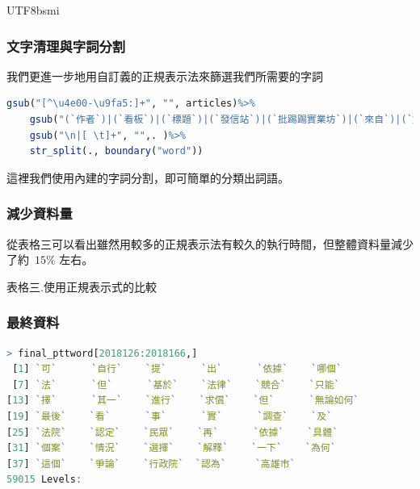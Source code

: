 \documentclass[utf8]{beamer}
\begin{document}
\begin{CJK}{UTF8}{bsmi}
\begin{frame}[fragile]
\frametitle{文字清理與字詞分割}
我們更進一步地用自訂義的正規表示法來篩選我們所需要的字詞
\begin{lstlisting}[language=R,backgroundcolor=\color{lightgray!0!white},identifierstyle=\color{blue},stringstyle=\color{orange},keywordstyle=\color{green!60!black}\bfseries]
gsub("[^\u4e00-\u9fa5:]+", "", articles)%>%
    gsub("(`作者`)|(`看板`)|(`標題`)|(`發信站`)|(`批踢踢實業坊`)|(`來自`)|(`文章網址`)|(`編輯`)|(`啊`)|(`喔`)|(`啦`)|(`你`)|(`我`)|(`他`)|(`們`)|(`推`)|(`的`)|(`噓`)|(`了`)|(`是`)|(`就`)|(`人`)|(`不`)|(`在`)|(`有`)|(`都`)|(`要`)|(`沒`)|(`還`)|(`也`)|(`說`)|(`會`)|(`嗎`)+","", .)%>%
    gsub("\n|[ \t]+", "",. )%>%
    str_split(., boundary("word"))
\end{lstlisting}
這裡我們使用內建的字詞分割，即可簡單的分類出詞語。
\end{frame}
\begin{frame}[fragile]
\frametitle{減少資料量}
從表格三可以看出雖然用較多的正規表示法有較久的執行時間，但整體資料量減少了約\ $15\%$ 左右。
\begin{table}[ht]
\centering
表格三.使用正規表示式的比較\\
\end{table}
\end{frame}

\begin{frame}[fragile]
\frametitle{最終資料}
\begin{lstlisting}[language=R,identifierstyle=\color{blue},stringstyle=\color{orange},keywordstyle=\color{green!60!black}\bfseries]
> final_pttword[2018126:2018166,]
 [1] `可`      `自行`    `提`      `出`      `依據`    `哪個`
 [7] `法`      `但`      `基於`    `法律`    `競合`    `只能`
[13] `擇`      `其一`    `進行`    `求償`    `但`      `無論如何`
[19] `最後`    `看`      `事`      `實`      `調查`    `及`
[25] `法院`    `認定`    `民眾`    `再`      `依據`    `具體`
[31] `個案`    `情況`    `選擇`    `解釋`    `一下`    `為何`
[37] `這個`    `爭論`    `行政院`  `認為`     `高雄市`
59015 Levels:
\end{lstlisting}
\end{frame}


\end{CJK}
\end{document}
